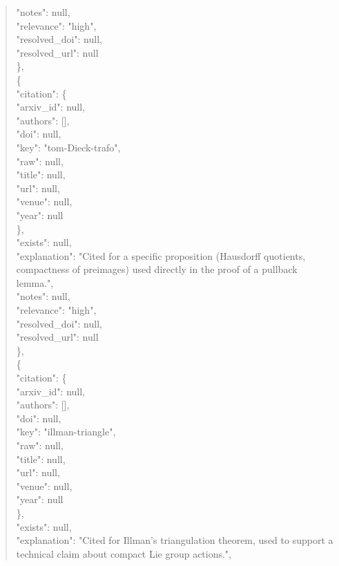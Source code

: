 \documentclass[11pt]{article}
\begin{document}
\begin{quote}
      "notes": null,\\
      "relevance": "high",\\
      "resolved\_doi": null,\\
      "resolved\_url": null\\
    \},\\
    \{\\
      "citation": \{\\
        "arxiv\_id": null,\\
        "authors": [],\\
        "doi": null,\\
        "key": "tom-Dieck-trafo",\\
        "raw": null,\\
        "title": null,\\
        "url": null,\\
        "venue": null,\\
        "year": null\\
      \},\\
      "exists": null,\\
      "explanation": "Cited for a specific proposition (Hausdorff quotients, compactness of preimages) used directly in the proof of a pullback lemma.",\\
      "notes": null,\\
      "relevance": "high",\\
      "resolved\_doi": null,\\
      "resolved\_url": null\\
    \},\\
    \{\\
      "citation": \{\\
        "arxiv\_id": null,\\
        "authors": [],\\
        "doi": null,\\
        "key": "illman-triangle",\\
        "raw": null,\\
        "title": null,\\
        "url": null,\\
        "venue": null,\\
        "year": null\\
      \},\\
      "exists": null,\\
      "explanation": "Cited for Illman's triangulation theorem, used to support a technical claim about compact Lie group actions.",\\

\end{quote}
\end{document}

